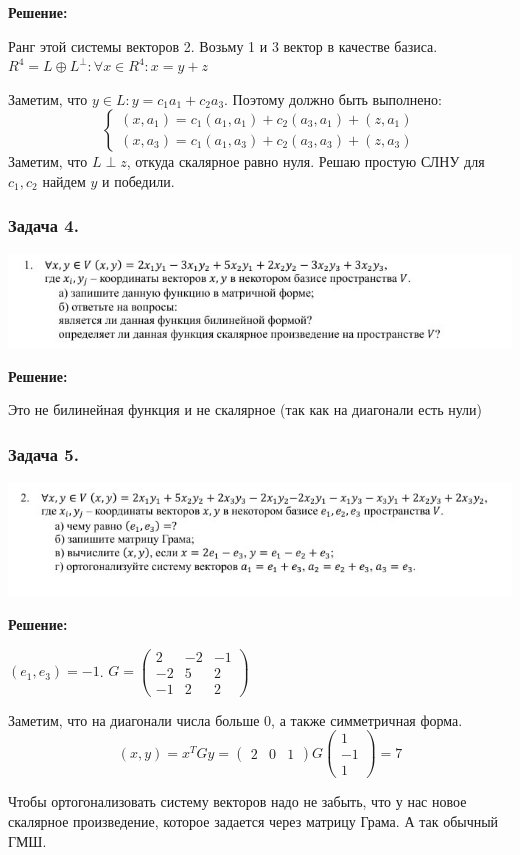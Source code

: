 \textbf{Решение:}

Ранг этой системы векторов 2. Возьму 1 и 3 вектор в качестве базиса. $R^4 = L \oplus L^\perp: \forall x \in R^4: x  =y +z$

Заметим, что $y \in L : y = c_1a_1 + c_2a_3$. Поэтому должно быть выполнено:
$$\begin{cases}
    (x,a_1) = c_1(a_1,a_1) + c_2(a_3,a_1)  + (z,a_1)\\
    (x,a_3) = c_1(a_1,a_3)  +c_2(a_3,a_3) + (z,a_3)
\end{cases}$$
Заметим, что $L \perp z$, откуда скалярное равно нуля. Решаю простую СЛНУ для $c_1,c_2$ найдем $y$ и победили.

\subsubsection{Задача 4.}

\begin{center}
   \includegraphics{assets/practice-4-task-4.jpg}
\end{center}

\textbf{Решение:}

Это не билинейная функция и не скалярное (так как на диагонали есть нули)

\subsubsection{Задача 5.}

\begin{center}
   \includegraphics{assets/practice-4-task-5.jpg}
\end{center}

\textbf{Решение:}

$(e_1,e_3 ) = -1$. $G = \begin{pmatrix}
    2 & -2 & -1\\
    -2 &5 & 2 \\
    -1 & 2 &2
\end{pmatrix}$

Заметим, что на диагонали числа больше 0, а также симметричная форма.
$$(x,y) = x^T G y = \begin{pmatrix}
    2 & 0 & 1 
\end{pmatrix} G \begin{pmatrix}
    1 \\
    -1\\
    1
\end{pmatrix} = 7$$

Чтобы ортогонализовать систему векторов надо не забыть, что у нас новое скалярное произведение, которое задается через матрицу Грама. А так обычный ГМШ.